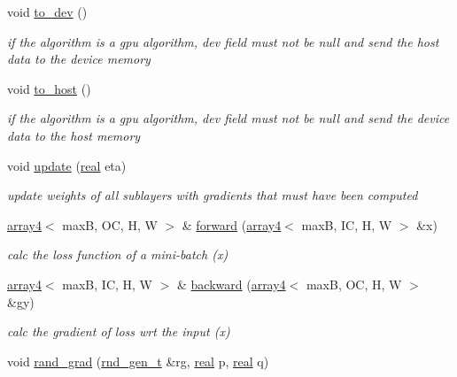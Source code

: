 \begin{DoxyCompactItemize}
\mbox{\label{structBlock_a5dfc150c9bbf7eb57ab9488a5096df8d}} 
void \hyperlink{structBlock_a5dfc150c9bbf7eb57ab9488a5096df8d}{to\+\_\+dev} ()
\begin{DoxyCompactList}\small\item\em if the algorithm is a gpu algorithm, dev field must not be null and send the host data to the device memory \end{DoxyCompactList}\item 
\mbox{\label{structBlock_aa0485907d27a19d4374e3ad09c5b9012}} 
void \hyperlink{structBlock_aa0485907d27a19d4374e3ad09c5b9012}{to\+\_\+host} ()
\begin{DoxyCompactList}\small\item\em if the algorithm is a gpu algorithm, dev field must not be null and send the device data to the host memory \end{DoxyCompactList}\item 
void \hyperlink{structBlock_a3d431dfca3c47701c1c41e471ea17c8b}{update} (\hyperlink{vgg__util_8h_a1082d08aaa761215ec83e7149f27ad16}{real} eta)
\begin{DoxyCompactList}\small\item\em update weights of all sublayers with gradients that must have been computed \end{DoxyCompactList}\item 
\hyperlink{structarray4}{array4}$<$ maxB, OC, H, W $>$ \& \hyperlink{structBlock_a6a6ee3389b0ea5618109c9ca525ba9bf}{forward} (\hyperlink{structarray4}{array4}$<$ maxB, IC, H, W $>$ \&x)
\begin{DoxyCompactList}\small\item\em calc the loss function of a mini-\/batch (x) \end{DoxyCompactList}\item 
\hyperlink{structarray4}{array4}$<$ maxB, IC, H, W $>$ \& \hyperlink{structBlock_a86b4cafe64fbb5d045b7f2bc401d9ddc}{backward} (\hyperlink{structarray4}{array4}$<$ maxB, OC, H, W $>$ \&gy)
\begin{DoxyCompactList}\small\item\em calc the gradient of loss wrt the input (x) \end{DoxyCompactList}\item 
void \hyperlink{structBlock_a3752b971026c8a6506b34aef3c7e780b}{rand\+\_\+grad} (\hyperlink{structrnd__gen__t}{rnd\+\_\+gen\+\_\+t} \&rg, \hyperlink{vgg__util_8h_a1082d08aaa761215ec83e7149f27ad16}{real} p, \hyperlink{vgg__util_8h_a1082d08aaa761215ec83e7149f27ad16}{real} q)

\end{DoxyCompactItemize}
